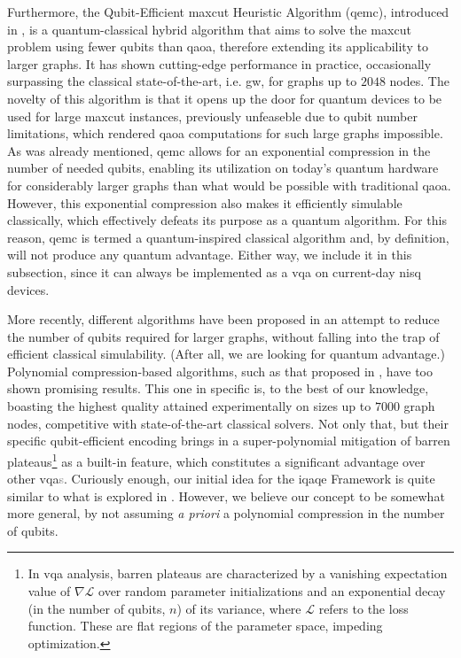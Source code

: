 Furthermore, the Qubit-Efficient \acrshort{maxcut} Heuristic Algorithm (\acrshort{qemc}), introduced in \cite{tenecohen2023variational}, is a quantum-classical hybrid algorithm that aims to solve the \acrshort{maxcut} problem using fewer qubits than \acrshort{qaoa}, therefore extending its applicability to larger graphs. It has shown cutting-edge performance in practice, occasionally surpassing the classical state-of-the-art, i.e. \acrshort{gw}, for graphs up to $2048$ nodes. The novelty of this algorithm is that it opens up the door for quantum devices to be used for large \acrshort{maxcut} instances, previously unfeaseble due to qubit number limitations, which rendered \acrshort{qaoa} computations for such large graphs impossible. As was already mentioned, \acrshort{qemc} allows for an exponential compression in the number of needed qubits, enabling its utilization on today's quantum hardware for considerably larger graphs than what would be possible with traditional \acrshort{qaoa}. However, this exponential compression also makes it efficiently simulable classically, which effectively defeats its purpose as a quantum algorithm. For this reason, \acrshort{qemc} is termed a quantum-inspired classical algorithm and, by definition, will not produce any quantum advantage. Either way, we include it in this subsection, since it can always be implemented as a \acrshort{vqa} on current-day \acrshort{nisq} devices.

More recently, different algorithms have been proposed in an attempt to reduce the number of qubits required for larger graphs, without falling into the trap of efficient classical simulability. (After all, we are looking for quantum advantage.) Polynomial compression-based algorithms, such as that proposed in \cite{sciorilli2024largescale}, have too shown promising results. This one in specific \cite{sciorilli2024largescale} is, to the best of our knowledge, boasting the highest quality attained experimentally on sizes up to $7000$ graph nodes, competitive with state-of-the-art classical solvers. Not only that, but their specific qubit-efficient encoding brings in a super-polynomial mitigation of barren plateaus\footnote{In \acrshort{vqa} analysis, barren plateaus are characterized by a vanishing expectation value of \(\nabla{\mathcal{L}}\) over random parameter initializations and an exponential decay (in the number of qubits, \(n\)) of its variance, where \(\mathcal{L}\) refers to the loss function. These are flat regions of the parameter space, impeding optimization.} as a built-in feature, which constitutes a significant advantage over other \acrshort{vqa}\textcolor{gray}{s}. Curiously enough, our initial idea for the \acrshort{iqaqe} Framework is quite similar to what is explored in \cite{sciorilli2024largescale}. However, we believe our concept to be somewhat more general, by not assuming \textit{a priori} a polynomial compression in the number of qubits.


